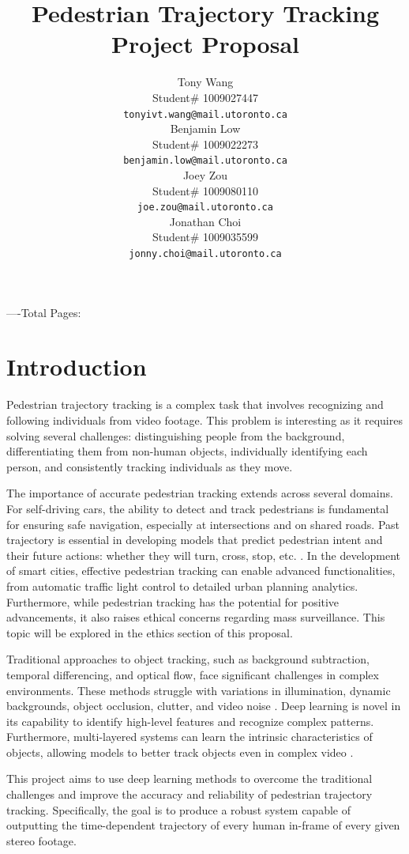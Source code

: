 \documentclass{article} %
\title{Pedestrian Trajectory Tracking  \\ 
Project Proposal}
\author{Tony Wang  \\
Student\# 1009027447\\
\texttt{tonyivt.wang@mail.utoronto.ca} \\
\And
Benjamin Low  \\
Student\# 1009022273 \\
\texttt{benjamin.low@mail.utoronto.ca} \\
\And
Joey Zou  \\
Student\# 1009080110 \\
\texttt{joe.zou@mail.utoronto.ca\hspace{45pt}} \\
\And
Jonathan Choi \\
Student\# 1009035599 \\
\texttt{jonny.choi@mail.utoronto.ca} \\
}
\begin{document}
\maketitle

----Total Pages: \pageref{last_page}

\section{Introduction}

Pedestrian trajectory tracking is a complex task that involves recognizing and following individuals from video footage. This problem is interesting as it requires solving several challenges: distinguishing people from the background, differentiating them from non-human objects, individually identifying each person, and consistently tracking individuals as they move.

The importance of accurate pedestrian tracking extends across several domains. For self-driving cars, the ability to detect and track pedestrians is fundamental for ensuring safe navigation, especially at intersections and on shared roads. Past trajectory is essential in developing models that predict pedestrian intent and their future actions: whether they will turn, cross, stop, etc. \citep{6632960}. In the development of smart cities, effective pedestrian tracking can enable advanced functionalities, from automatic traffic light control to detailed urban planning analytics. Furthermore, while pedestrian tracking has the potential for positive advancements, it also raises ethical concerns regarding mass surveillance. This topic will be explored in the ethics section of this proposal.

Traditional approaches to object tracking, such as background subtraction, temporal differencing, and optical flow, face significant challenges in complex environments. These methods struggle with variations in illumination, dynamic backgrounds, object occlusion, clutter, and video noise \citep{shaikh2014}. Deep learning is novel in its capability to identify high-level features and recognize complex patterns. Furthermore, multi-layered systems can learn the intrinsic characteristics of objects, allowing models to better track objects even in complex video \citep{jin2024}.

This project aims to use deep learning methods to overcome the traditional challenges and improve the accuracy and reliability of pedestrian trajectory tracking. Specifically, the goal is to produce a robust system capable of outputting the time-dependent trajectory of every human in-frame of every given stereo footage.
\end{document}
